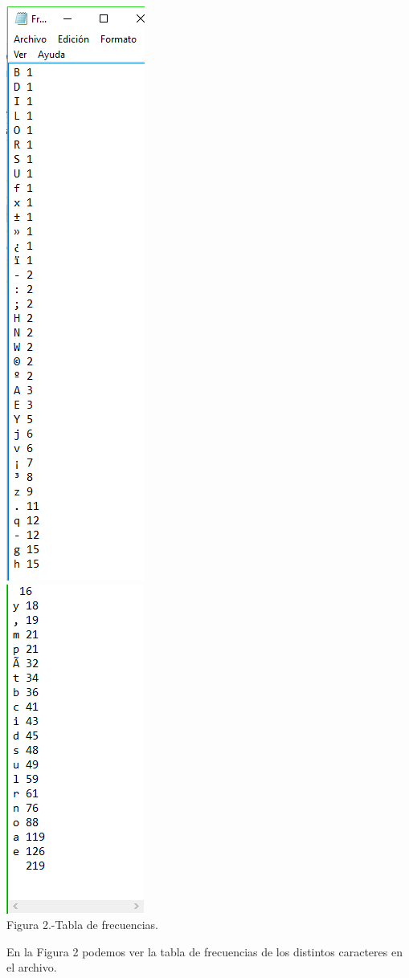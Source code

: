 \documentclass[spanish]{article}
\begin{document}
	\begin{center}
		\includegraphics[scale=.5]{./imagenes/prog2.png}\\
		\includegraphics[scale=.5]{./imagenes/prog3.png}\\
		Figura 2.-Tabla de frecuencias.
	\end{center}
En la Figura 2 podemos ver la tabla de frecuencias de los distintos caracteres en el archivo.
\end{document}
